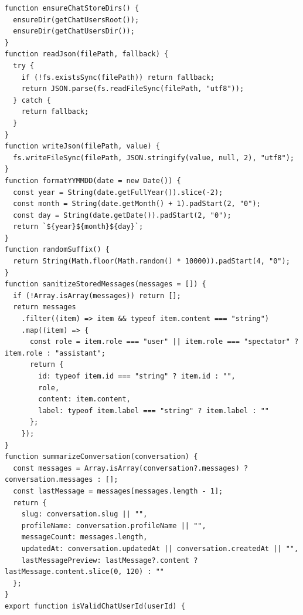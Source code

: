 \documentclass[12pt,a4paper]{article}
\begin{document}
\begin{Verbatim}[fontsize=\footnotesize]
function ensureChatStoreDirs() {
  ensureDir(getChatUsersRoot());
  ensureDir(getChatUsersDir());
}
function readJson(filePath, fallback) {
  try {
    if (!fs.existsSync(filePath)) return fallback;
    return JSON.parse(fs.readFileSync(filePath, "utf8"));
  } catch {
    return fallback;
  }
}
function writeJson(filePath, value) {
  fs.writeFileSync(filePath, JSON.stringify(value, null, 2), "utf8");
}
function formatYYMMDD(date = new Date()) {
  const year = String(date.getFullYear()).slice(-2);
  const month = String(date.getMonth() + 1).padStart(2, "0");
  const day = String(date.getDate()).padStart(2, "0");
  return `${year}${month}${day}`;
}
function randomSuffix() {
  return String(Math.floor(Math.random() * 10000)).padStart(4, "0");
}
function sanitizeStoredMessages(messages = []) {
  if (!Array.isArray(messages)) return [];
  return messages
    .filter((item) => item && typeof item.content === "string")
    .map((item) => {
      const role = item.role === "user" || item.role === "spectator" ? item.role : "assistant";
      return {
        id: typeof item.id === "string" ? item.id : "",
        role,
        content: item.content,
        label: typeof item.label === "string" ? item.label : ""
      };
    });
}
function summarizeConversation(conversation) {
  const messages = Array.isArray(conversation?.messages) ? conversation.messages : [];
  const lastMessage = messages[messages.length - 1];
  return {
    slug: conversation.slug || "",
    profileName: conversation.profileName || "",
    messageCount: messages.length,
    updatedAt: conversation.updatedAt || conversation.createdAt || "",
    lastMessagePreview: lastMessage?.content ? lastMessage.content.slice(0, 120) : ""
  };
}
export function isValidChatUserId(userId) {
\end{Verbatim}
\newpage
{}
\fancyhead[R]{}
\end{document}
